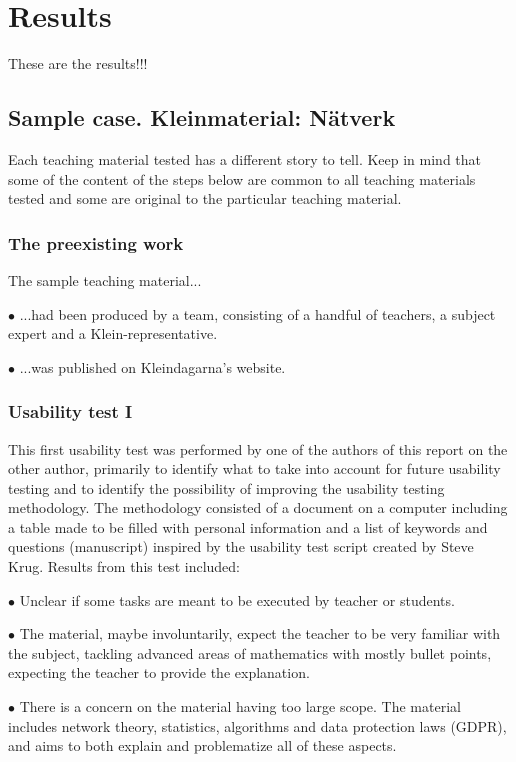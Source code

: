 \chapter{Results}
These are the results!!!
%

\section{Sample case. Kleinmaterial: Nätverk}
Each teaching material tested has a different story to tell. Keep in mind that some of the content of the steps below are common to all teaching materials tested and some are original to the particular teaching material.

\subsection{The preexisting work}
The sample teaching material...
\begin{description}
    \item $\bullet$ ...had been produced by a team, consisting of a handful of teachers, a subject expert and a Klein-representative.
    \item $\bullet$ ...was published on Kleindagarna's website.
\end{description}

\subsection{Usability test I}
This first usability test was performed by one of the authors of this report on the other author, primarily to identify what to take into account for future usability testing and to identify the possibility of improving the usability testing methodology. The methodology consisted of a document on a computer including a table made to be filled with personal information and a list of keywords and questions (manuscript) inspired by the usability test script created by Steve Krug. Results from this test included:
\begin{description}
    \item $\bullet$ Unclear if some tasks are meant to be executed by teacher or students.
    \item $\bullet$ The material, maybe involuntarily, expect the teacher to be very familiar with the subject, tackling advanced areas of mathematics with mostly bullet points, expecting the teacher to provide the explanation.
    \item $\bullet$ There is a concern on the material having too large scope. The material includes network theory, statistics, algorithms and data protection laws (GDPR), and aims to both explain and problematize all of these aspects.
\end{description}
